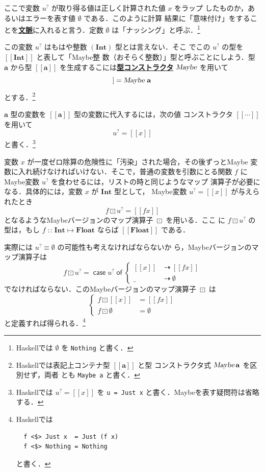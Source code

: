 \documentclass[a5paper,twoside,fleqn,draft]{jsbook}
\def\[{[\![}
\def\]{]\!]}
\newcommand{\programminglanguage}[1]{\textsf{#1}}
\newcommand{\haskell}{\programminglanguage{Haskell}}
\newcommand{\keyword}[1]{{\underline{\textbf{#1}}}}
\newcommand{\code}[1]{\texttt{#1}}
\newcommand{\mKeyword}[1]{\mathsf{#1}}
\newcommand{\mCaseKeyword}{\mKeyword{case}}
\newcommand{\mOfKeyword}{\mKeyword{of}}
\DeclareMathOperator{\mCaseKW}{\mCaseKeyword}
\DeclareMathOperator{\mOfKW}{\mOfKeyword}
\newcommand{\mNothing}{\emptyset}
\DeclareMathOperator{\mIfSo}{\dashrightarrow}
\DeclareMathOperator{\mIn}{{:\!:}}
\DeclareMathOperator{\mMapMaybe}{\boxdot}
\DeclareMathOperator{\mMapsTo}{\mapsto}
\newcommand{\mType}[1]{\mathbf{#1}} %
\newcommand{\mA}{\mType{a}}
\newcommand{\mFloatType}{\mType{Float}}
\newcommand{\mIntType}{\mType{Int}}
\newcommand{\mTypeAssemble}[2]{{}^{\mType{#1}}\[\mType{#2}\]}
\newcommand{\mMaybeType}[1]{\[\mType{#1}\]}%
\newcommand{\mTypeConstructor}[1]{\textsl{#1}}
\DeclareMathOperator{\mMaybeTypeConstructor}{\mTypeConstructor{Maybe}}
\newcommand{\mValueConstructor}[1]{\mathrm{#1}}
\newcommand{\mValueWith}[2]{{}^\mValueConstructor{#1}\[#2\]}
\newcommand{\mJustWith}[1]{\[#1\]}%
\newcommand{\mMaybe}[1]{{#1}^?}
\newcommand{\mCaseOf}[1]{\mCaseKW#1\mOfKW}
\newcommand{\mProjEXP}[2]{#1\mMapsTo#2} %
\begin{document}
ここで変数 $\mMaybe{u}$ が取り得る値は正しく計算された値 $x$ をラップ
したものか，あるいはエラーを表す値 $\mNothing$ である．このように計算
結果に「意味付け」をすることを\keyword{文脈}に入れると言う．定数
$\mNothing$ は「ナッシング」と呼ぶ．\footnote{\haskell では
  $\mNothing$ を \code{Nothing} と書く．}

この変数 $\mMaybe{u}$ はもはや整数 $(\mIntType)$ 型とは言えない．そこ
でこの $\mMaybe{u}$ の型を $\mMaybeType{\mIntType}$ と表して「Maybe整
  数（おそらく整数）」型と呼ぶことにしよう．型 $\mA $ から型
$\mMaybeType{a}$ を生成するこには\keyword{型コンストラクタ}
$\mMaybeTypeConstructor$ を用いて
\begin{equation}
  \mMaybeType{a}
  =\mMaybeTypeConstructor\,\mA
\end{equation}
とする．\footnote{\haskell では表記上コンテナ型 $\mMaybeType{a}$ と型
  コンストラクタ式 $\mMaybeTypeConstructor\mA$ を区別せず，両者
  とも \code{Maybe a} と書く．}

$\mA $ 型の変数を $\mMaybeType{a}$ 型の変数に代入するには，次の値
コンストラクタ $\mJustWith{\dotsb}$ を用いて
\begin{equation}
  \mMaybe{u}
  =\mJustWith{x}
\end{equation}
と書く．\footnote{\haskell では $\mMaybe{u}=\mJustWith{x}$ を \code{u
    = Just x} と書く．Maybeを表す疑問符は省略する．}

変数 $x$ が一度ゼロ除算の危険性に「汚染」された場合，その後ずっとMaybe
変数に入れ続けなければいけない．そこで，普通の変数を引数にとる関数 $f$
にMaybe変数 $\mMaybe{u}$ を食わせるには，リストの時と同じようなマップ
演算子が必要になる．具体的には，変数 $x$ が $\mType{Int}$ 型として，
Maybe変数 $\mMaybe{u}=\mJustWith{x}$ が与えられたとき
\begin{equation}
  f\mMapMaybe\mMaybe{u}
  =\mJustWith{fx}
\end{equation}
となるようなMaybeバージョンのマップ演算子 $\mMapMaybe$ を用いる．ここ
に $f\mMapMaybe\mMaybe{u}$ の型は，もし
$f\mIn\mProjEXP{\mIntType}{\mFloatType}$ ならば
$\mMaybeType{\mFloatType}$ である．

実際には $\mMaybe{u}\equiv\mNothing$ の可能性も考えなければならないか
ら，Maybeバージョンのマップ演算子は
\begin{equation}
  f\mMapMaybe\mMaybe{u}
  =\mCaseOf{\mMaybe{u}}
  \begin{cases}
    \mJustWith{x}
    &\mIfSo\mJustWith{fx}\\
    \_
    &\mIfSo\mNothing
  \end{cases}
\end{equation}
でなければならない．このMaybeバージョンのマップ演算子 $\mMapMaybe$ は
\begin{equation}
  \left\{
  \begin{aligned}
    f\mMapMaybe\mJustWith{x}
    &=\mJustWith{fx}\\
    f\mMapMaybe\mNothing
    &=\mNothing
  \end{aligned}
  \right.
\end{equation}
と定義すれば得られる．\footnote{\haskell では
\begin{verbatim}
  f <$> Just x  = Just (f x)
  f <$> Nothing = Nothing
\end{verbatim}
と書く．}
\end{document}
